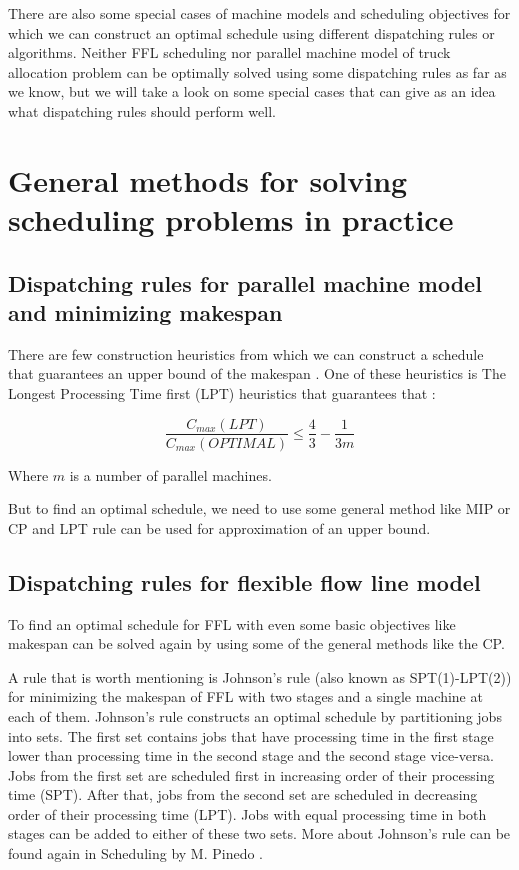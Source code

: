 \documentclass{ctuthesis}
\begin{document}
There are also some special cases of machine models and scheduling objectives for which we can construct an optimal schedule using different dispatching rules or algorithms. Neither FFL scheduling nor parallel machine model of truck allocation problem can be optimally solved using some dispatching rules as far as we know, but we will take a look on some special cases that can give as an idea what dispatching rules should perform well.

\section{General methods for solving scheduling problems in practice}

\subsection{Dispatching rules for parallel machine model and minimizing makespan}

There are few construction heuristics from which we can construct a schedule that guarantees an upper bound of the makespan \cite{gram}. One of these heuristics is The Longest Processing Time first (LPT) heuristics \cite{pinedo} that guarantees that \cite{gram1969}:

\begin{equation}
\dfrac{C_{max}(LPT)}{C_{max}(OPTIMAL)} \leq \dfrac{4}{3} - \dfrac{1}{3m}
\end{equation}

Where $m$ is a number of parallel machines.

But to find an optimal schedule, we need to use some general method like MIP or CP and LPT rule can be used for approximation of an upper bound.

\subsection{Dispatching rules for flexible flow line model}
\label{subsec:ffl}
To find an optimal schedule for FFL with even some basic objectives like makespan can be solved again by using some of the general methods like the CP. 

A rule that is worth mentioning is Johnson's rule (also known as SPT(1)-LPT(2)) for minimizing the makespan of FFL with two stages and a single machine at each of them. Johnson's rule constructs an optimal schedule by partitioning jobs into sets. The first set contains jobs that have processing time in the first stage lower than processing time in the second stage and the second stage vice-versa. 
Jobs from the first set are scheduled first in increasing order of their processing time (SPT). After that, jobs from the second set are scheduled in decreasing order of their processing time (LPT). Jobs with equal processing time in both stages can be added to either of these two sets. More about Johnson's rule can be found again in Scheduling by M. Pinedo \cite{pinedo}.
\end{document}
